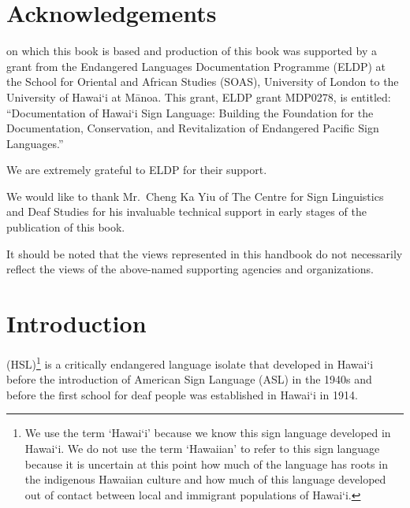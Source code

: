 \documentclass{tufte-book}
\begin{document}
\tableofcontents






\cleardoublepage

\chapter{Acknowledgements}

 on which this book is based and production of this book was supported by a grant from the Endangered Languages Documentation Programme (ELDP) at the School for Oriental and African Studies (SOAS), University of London to the University of Hawai‘i at M\={a}noa. This grant, ELDP grant MDP0278, is entitled: “Documentation of Hawai‘i Sign Language: Building the Foundation for the Documentation, Conservation, and Revitalization of Endangered Pacific Sign Languages.”

We are extremely grateful to ELDP for their support.

We would like to thank Mr.~Cheng Ka Yiu of The Centre for Sign Linguistics and Deaf Studies for his invaluable technical support in early stages of the publication of this book. 

It should be noted that the views represented in this handbook do not necessarily reflect
the views of the above-named supporting agencies and organizations.

\chapter{Introduction}

 (HSL)\footnote{We use the term `Hawai‘i' because we know this sign language developed in Hawai‘i. We do not use the term `Hawaiian' to refer to this sign language because it is uncertain at this point how much of the language has roots in the indigenous Hawaiian culture and how much of this language developed out of contact between local and immigrant populations of Hawai‘i.} is a critically endangered language isolate that developed in Hawai‘i before the introduction of American Sign Language (ASL) in the 1940s and before the first school for deaf people was established in Hawai‘i in 1914.
\end{document}
